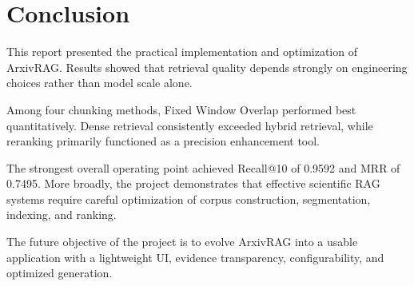 \documentclass[a4paper,12pt]{article}
\begin{document}
\section{Conclusion}

This report presented the practical implementation and optimization of ArxivRAG. Results showed that retrieval quality depends strongly on engineering choices rather than model scale alone.

Among four chunking methods, Fixed Window Overlap performed best quantitatively. Dense retrieval consistently exceeded hybrid retrieval, while reranking primarily functioned as a precision enhancement tool.

The strongest overall operating point achieved Recall@10 of 0.9592 and MRR of 0.7495. More broadly, the project demonstrates that effective scientific RAG systems require careful optimization of corpus construction, segmentation, indexing, and ranking.

The future objective of the project is to evolve ArxivRAG into a usable application with a lightweight UI, evidence transparency, configurability, and optimized generation.


\end{document}
